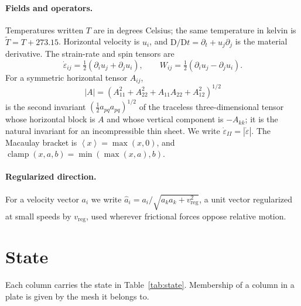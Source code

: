\documentclass[11pt]{article}
\newcommand{\mac}[1]{\left\langle #1 \right\rangle}
\newcommand{\inv}[1]{\left| #1 \right|}
\newcommand{\Tk}{\tilde{T}}
\begin{document}
\paragraph{Fields and operators.}
Temperatures written $T$ are in degrees Celsius; the same temperature in kelvin
is $\Tk = T + 273.15$. Horizontal velocity is $u_i$, and
$\mathrm{D}/\mathrm{D}t = \partial_t + u_j\partial_j$ is the material
derivative. The strain-rate and spin tensors are
\begin{equation}
  \dot\varepsilon_{ij} = \tfrac12\left(\partial_i u_j + \partial_j u_i\right),
  \qquad
  W_{ij} = \tfrac12\left(\partial_i u_j - \partial_j u_i\right).
\end{equation}
For a symmetric horizontal tensor $A_{ij}$,
\begin{equation}
  \inv{A} = \left(A_{11}^2 + A_{22}^2 + A_{11}A_{22} + A_{12}^2\right)^{1/2}
  \label{eq:invariant}
\end{equation}
is the second invariant $\left(\tfrac12 a_{pq}a_{pq}\right)^{1/2}$ of the
traceless three-dimensional tensor whose horizontal block is $A$ and whose
vertical component is $-A_{kk}$; it is the natural invariant for an
incompressible thin sheet. We write $\dot\varepsilon_{II} =
\inv{\dot\varepsilon}$. The Macaulay bracket is $\mac{x} = \max(x,0)$, and
$\operatorname{clamp}(x,a,b) = \min(\max(x,a),b)$.

\paragraph{Regularized direction.}
For a velocity vector $a_i$ we write
$\hat a_i = a_i / \sqrt{a_k a_k + v_{\mathrm{reg}}^2}$, a unit vector
regularized at small speeds by $v_{\mathrm{reg}}$, used wherever frictional
forces oppose relative motion.

\section{State}
\label{sec:state}

Each column carries the state in Table~\ref{tab:state}. Membership of a column
in a plate is given by the mesh it belongs to.
\end{document}
